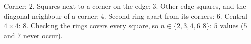 Corner: $2$. Squares next to a corner on the edge: $3$. Other edge squares, and the diagonal neighbour of a corner: $4$. Second ring apart from its corners: $6$. Central $4\times4$: $8$. Checking the rings covers every square, so $n\in\{2,3,4,6,8\}$: $\boxed{5}$ values ($5$ and $7$ never occur).
